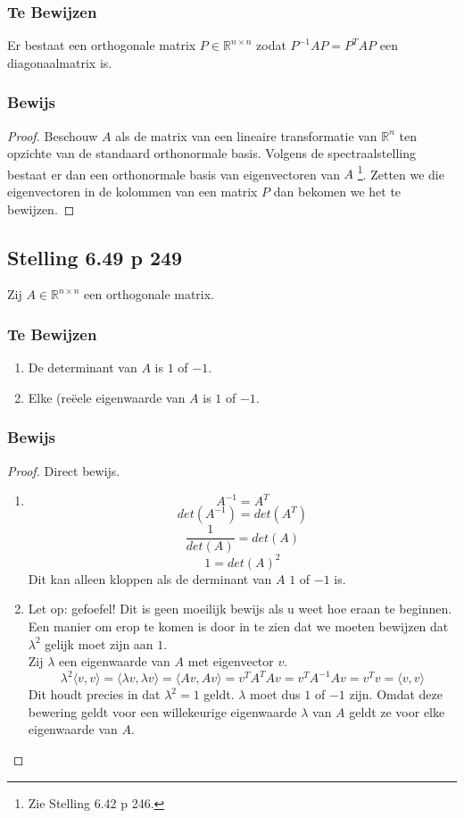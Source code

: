 \documentclass[lineaire_algebra_oplossingen.tex]{subfiles}
\begin{document}
\subsubsection*{Te Bewijzen}
Er bestaat een orthogonale matrix $P\in \mathbb{R}^{n\times n}$ zodat $P^{-1}AP = P^TAP$ een diagonaalmatrix is.
\subsubsection*{Bewijs}
\begin{proof}
Beschouw $A$ als de matrix van een lineaire transformatie van $\mathbb{R}^n$ ten opzichte van de standaard orthonormale basis.
Volgens de spectraalstelling bestaat er dan een orthonormale basis van eigenvectoren van $A$ \footnote{Zie Stelling 6.42 p 246.}.
Zetten we die eigenvectoren in de kolommen van een matrix $P$ dan bekomen we het te bewijzen.
\end{proof}

\subsection{Stelling 6.49 p 249}
Zij $A\in \mathbb{R}^{n\times n}$ een orthogonale matrix.
\subsubsection*{Te Bewijzen}
\begin{enumerate}
\item De determinant van $A$ is $1$ of $-1$.
\item Elke (re\"eele eigenwaarde van $A$ is $1$ of $-1$.
\end{enumerate}
\subsubsection*{Bewijs}
\begin{proof}
Direct bewijs.
\begin{enumerate}
\item
\[
A^{-1} = A^T
\]
\[
det(A^{-1}) = det(A^T)
\]
\[
\frac{1}{det(A)} = det(A)
\]
\[
1 = det(A)^2
\]
Dit kan alleen kloppen als de derminant van $A$ $1$ of $-1$ is.
\item
Let op: gefoefel! Dit is geen  moeilijk bewijs als u weet hoe eraan te beginnen. Een manier om erop te komen is door in te zien dat we moeten bewijzen dat $\lambda^2$ gelijk moet zijn aan $1$.\\
Zij $\lambda$ een eigenwaarde van $A$ met eigenvector $v$.
\[
\lambda^2\langle v,v\rangle = \langle \lambda v,\lambda v\rangle = \langle A v,A v\rangle = v^TA^T A v = v^TA^{-1} A v = v^Tv = \langle v, v \rangle
\]
Dit houdt precies in dat $\lambda^2 = 1$ geldt. $\lambda$ moet dus $1$ of $-1$ zijn. Omdat deze bewering geldt voor een willekeurige eigenwaarde $\lambda$ van $A$ geldt ze voor elke eigenwaarde van $A$.

\end{enumerate}
\end{proof}
\end{document}
